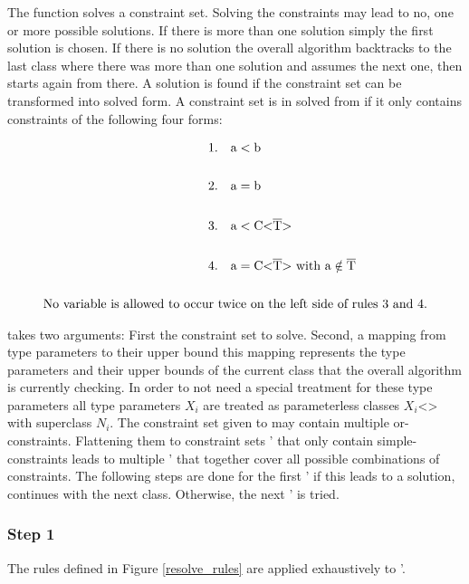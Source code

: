 The function  solves a constraint set. Solving the constraints may lead to no, one or more possible solutions. If there is more than one solution simply the first solution is chosen. If there is no solution the overall algorithm backtracks to the last class where there was more than one solution and assumes the next one, then starts again from there.
A solution is found if the constraint set can be transformed into solved form. A constraint set is in solved from if it only contains constraints of the following four forms:

\begin{align*}
    1.& \quad \text{a} < \text{b}\\
    \\
    2.& \quad \text{a} = \text{b}\\
    \\
    3.& \quad \text{a} < \text{C<} \ot{T} \text{>}\\
    \\
    4.& \quad \text{a} = \text{C<} \ot{T} \text{>} \ \text{with a} \notin \ot{T}\\
    \\
    \text{No variable is allowed to occur } & \text{twice on the left side of rules 3 and 4.}
\end{align*}

 takes two arguments: First the constraint set to solve. Second, a mapping from type parameters  to their upper bound  this mapping represents the type parameters and their upper bounds of the current class that the overall algorithm is currently checking.
In order to not need a special treatment for these type parameters all type parameters $X_i$ are treated as parameterless classes $X_i$<> with superclass $N_i$.
The constraint set  given to  may contain multiple or-constraints. Flattening them to constraint sets ' that only contain simple-constraints leads to multiple ' that together cover all possible combinations of constraints.
The following steps are done for the first ' if this leads to a solution,  continues with the next class. Otherwise, the next ' is tried.

\subsubsection{Step 1}
The rules defined in Figure \ref{resolve_rules} are applied exhaustively to '.

